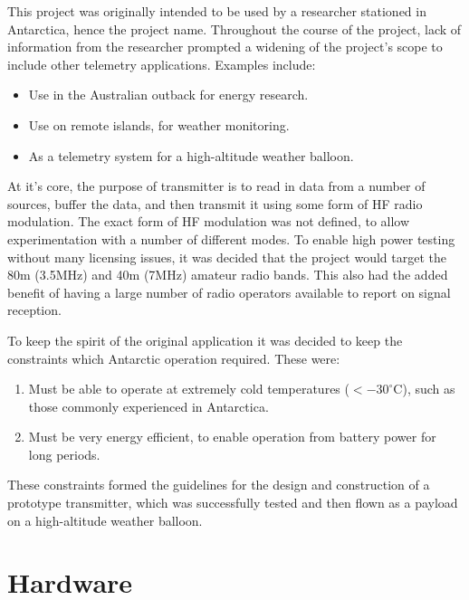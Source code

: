 \documentclass[a4paper,12pt]{article}
\begin{document}
This project was originally intended to be used by a researcher stationed in Antarctica, hence the project name. Throughout the course of the project, lack of information from the researcher prompted a widening of the project's scope to include other telemetry applications. Examples include:
\begin{itemize}
\item Use in the Australian outback for energy research.
\item Use on remote islands, for weather monitoring.
\item As a telemetry system for a high-altitude weather balloon. 
\end{itemize}

At it's core, the purpose of transmitter is to read in data from a number of sources, buffer the data, and then transmit it using some form of HF radio modulation. The exact form of HF modulation was not defined, to allow experimentation with a number of different modes. To enable high power testing without many licensing issues, it was decided that the project would target the 80m (3.5MHz) and 40m (7MHz) amateur radio bands. This also had the added benefit of having a large number of radio operators available to report on signal reception.

To keep the spirit of the original application it was decided to keep the constraints which Antarctic operation required. These were:
\begin{enumerate}
\item Must be able to operate at extremely cold temperatures ($<-30^\circ$C), such as those commonly experienced in Antarctica.
\item Must be very energy efficient, to enable operation from battery power for long periods.
\end{enumerate}

These constraints formed the guidelines for the design and construction of a prototype transmitter, which was successfully tested and then flown as a payload on a high-altitude weather balloon.

\newpage
\section{Hardware}
\end{document}
